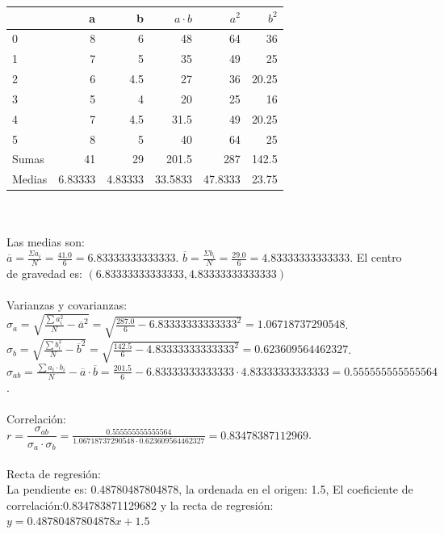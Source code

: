 \documentclass[addpoints,spanish, 12pt,a4paper]{exam}
\begin{document}
\begin{questions}
\begin{solution}
\begin{tabular}{lrrrrr}
\hline
        &        a &        b &   $a\cdot b$ &    $a^2$ &   $b^2$ \\
\hline
 0      &  8       &  6       &      48      &  64      &   36    \\
 1      &  7       &  5       &      35      &  49      &   25    \\
 2      &  6       &  4.5     &      27      &  36      &   20.25 \\
 3      &  5       &  4       &      20      &  25      &   16    \\
 4      &  7       &  4.5     &      31.5    &  49      &   20.25 \\
 5      &  8       &  5       &      40      &  64      &   25    \\
 Sumas  & 41       & 29       &     201.5    & 287      &  142.5  \\
 Medias &  6.83333 &  4.83333 &      33.5833 &  47.8333 &   23.75 \\
\hline
\end{tabular}
\\ \\ Las medias son: \\$\overline{a}=\frac{\Sigma{a_i}}{N}=\frac{41.0}{6}=6.83333333333333$. $\overline{b}=\frac{\Sigma{b_i}}{N}=\frac{29.0}{6}=4.83333333333333$.  El centro de gravedad es: $(6.83333333333333,4.83333333333333)$ \\ \\ Varianzas y covarianzas: \\ $\sigma_a=\sqrt{\frac{\sum{a_i^2}}{N}-\overline{a}^2}=\sqrt{\frac{287.0}{6}-6.83333333333333^2}=1.06718737290548$.\\ $\sigma_b=\sqrt{\frac{\sum{b_i^2}}{N}-\overline{b}^2}=\sqrt{\frac{142.5}{6}-4.83333333333333^2}=0.623609564462327$.\\ $\sigma_{ab}=\frac{\sum{a_i \cdot b_i}}{N}-\overline{a}\cdot \overline{b}=\frac{201.5}{6}-6.83333333333333\cdot 4.83333333333333=0.555555555555564$. \\ \\ Correlación: \\ $r=\dfrac{\sigma_{ab}}{\sigma_a \cdot \sigma_b}=\frac{0.555555555555564}{1.06718737290548\cdot 0.623609564462327}=0.83478387112969$. \\ \\ Recta de regresión: \\ La pendiente es: 0.48780487804878, la ordenada en el origen: 1.5, El coeficiente de correlación:0.834783871129682 y la recta de regresión: $y = 0.48780487804878 x + 1.5$
\\


\end{solution}
\end{questions}
\end{document}
